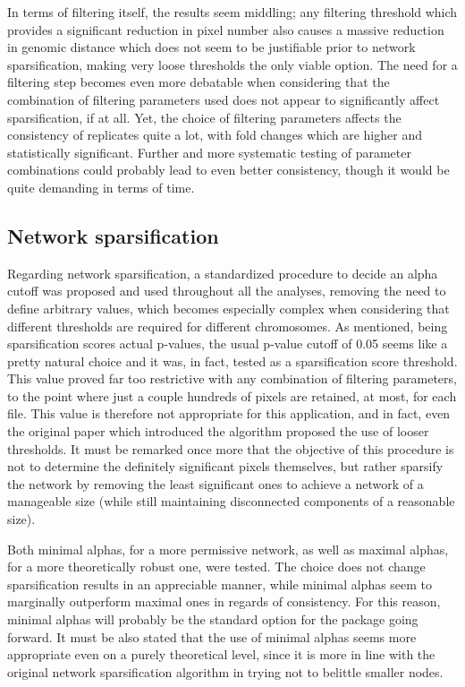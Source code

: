 In terms of filtering itself, the results seem middling; any filtering threshold which provides a significant reduction in pixel number also causes a massive reduction in genomic distance which does not seem to be justifiable prior to network sparsification, making very loose thresholds the only viable option. The need for a filtering step becomes even more debatable when considering that the combination of filtering parameters used does not appear to significantly affect sparsification, if at all. Yet, the choice of filtering parameters affects the consistency of replicates quite a lot, with fold changes which are higher and statistically significant. Further and more systematic testing of parameter combinations could probably lead to even better consistency, though it would be quite demanding in terms of time.

\subsection{Network sparsification}
Regarding network sparsification, a standardized procedure to decide an alpha cutoff was proposed and used throughout all the analyses, removing the need to define arbitrary values, which becomes especially complex when considering that different thresholds are required for different chromosomes. As mentioned, being sparsification scores actual p-values, the usual p-value cutoff of 0.05 seems like a pretty natural choice and it was, in fact, tested as a sparsification score threshold. This value proved far too restrictive with any combination of filtering parameters, to the point where just a couple hundreds of pixels are retained, at most, for each file. This value is therefore not appropriate for this application, and in fact, even the original paper which introduced the algorithm proposed the use of looser thresholds. It must be remarked once more that the objective of this procedure is not to determine the definitely significant pixels themselves, but rather sparsify the network by removing the least significant ones to achieve a network of a manageable size (while still maintaining disconnected components of a reasonable size). 

Both minimal alphas, for a more permissive network, as well as maximal alphas, for a more theoretically robust one, were tested. The choice does not change sparsification results in an appreciable manner, while minimal alphas seem to marginally outperform maximal ones in regards of consistency. For this reason, minimal alphas will probably be the standard option for the package going forward. It must be also stated that the use of minimal alphas seems more appropriate even on a purely theoretical level, since it is more in line with the original network sparsification algorithm in trying not to belittle smaller nodes. 

